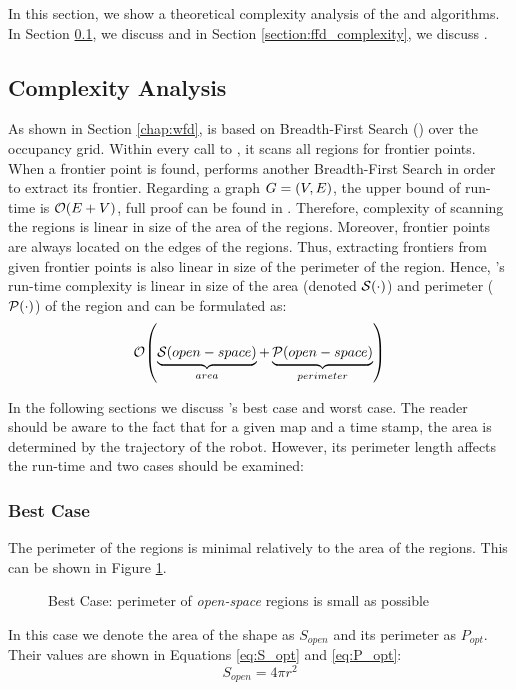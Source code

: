 In this section, we show a theoretical complexity analysis of the \WFD and \FFD algorithms. 
In Section \ref{section:wfd_complexity}, we discuss \WFD
and in Section \ref{section:ffd_complexity}, we discuss \FFD.

\subsection{\WFD Complexity Analysis}
\label{section:wfd_complexity}
As shown in Section \ref{chap:wfd}, \WFD is based on Breadth-First
Search (\BFS) over the occupancy grid. Within every call to \WFD, it
scans all \openspace regions for frontier points. When a frontier
point is found, \WFD performs another Breadth-First Search in order to
extract its frontier. Regarding a graph $G={\left(V,E\right)}$, the upper bound of \BFS
run-time is $\mathcal{O}{\left(E+V\right)}$, full proof can be found in \cite{Cormen2001}.
Therefore, complexity of scanning the \openspace regions is linear in size of
the area of the \openspace regions. Moreover, frontier points are always located
on the edges of the \openspace regions. Thus, extracting frontiers from given frontier points
is also linear in size of the perimeter of the \openspace region.  
Hence, \WFD's run-time complexity is linear in size of the area (denoted
$\mathcal{S}{\left(\cdot\right)}$) and perimeter ($\mathcal{P}{\left(\cdot\right)}$) of the
\openspace region and can be formulated as:
\begin{equation}\label{eq:wfd_general_complexity}
\mathcal{O}{\left(\underbrace{\mathcal{S}{\left(open-space\right)}}_{area} +
\underbrace{\mathcal{P}{\left(open-space\right)}}_{perimeter}\right)}
\end{equation}

In the following sections we discuss \WFD's best case and worst
case. The reader should be aware to the fact that for a given map and a time
stamp, the \openspace area is determined by the trajectory of the robot.
However, its perimeter length affects the run-time and two cases
should be examined:

\subsubsection{\WFD Best Case}
The perimeter of the \openspace regions is minimal relatively to
the area of the \openspace regions. This can be shown in Figure
\ref{fig:wfd_best_case}.
\begin{figure}
  \centering
  
	\caption{\WFD Best Case: perimeter of \emph{open-space} regions
	is small as possible}
	\label{fig:wfd_best_case}
\end{figure}
In this case we denote the area of the shape as $S_{open}$ and its perimeter as
$P_{opt}$. Their values are shown in Equations \eqref{eq:S_opt} and
\eqref{eq:P_opt}:
\begin{equation}\label{eq:S_opt}
S_{open} = 4\pi r^2
\end{equation}

